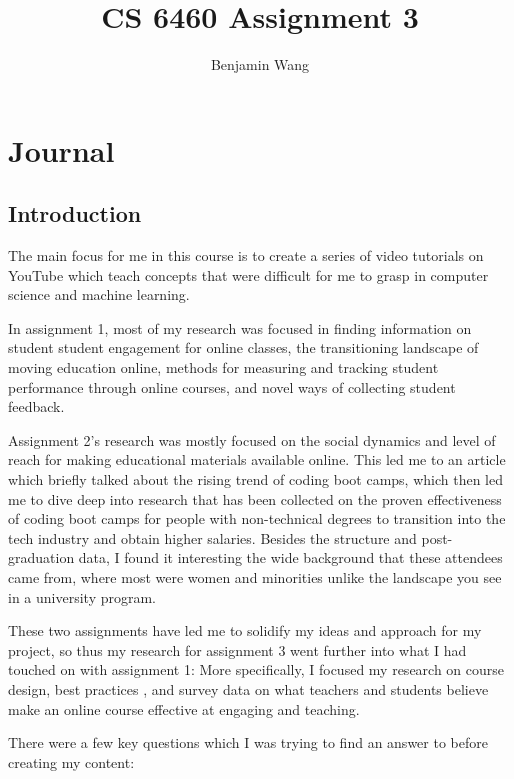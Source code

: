 \documentclass[
	letterpaper, %
]{jdf}
\author{Benjamin Wang}
\title{CS 6460 Assignment 3}
\begin{document}

\maketitle

\section{Journal}

\subsection{Introduction}

The main focus for me in this course is to create a series of video tutorials on YouTube which teach concepts that were difficult for me to grasp in computer science and machine learning. 

In assignment 1, most of my research was focused in finding information on student student engagement for online classes, the transitioning landscape of moving education online, methods for measuring and tracking student performance through online courses, and novel ways of collecting student feedback.

Assignment 2's research was mostly focused on the social dynamics and level of reach for making educational materials available online. This led me to an article which briefly talked about the rising trend of coding boot camps, which then led me to dive deep into research that has been collected on the proven effectiveness of coding boot camps for people with non-technical degrees to transition into the tech industry and obtain higher salaries. Besides the structure and post-graduation data, I found it interesting the wide background that these attendees came from, where most were women and minorities unlike the landscape you see in a university program.

These two assignments have led me to solidify my ideas and approach for my project, so thus my research for assignment 3 went further into what I had touched on with assignment 1: More specifically, I focused my research on course design, best practices \citep{smissen5}, and survey data on what teachers and students believe make an online course effective at engaging and teaching.

There were a few key questions which I was trying to find an answer to before creating my content:
\end{document}
